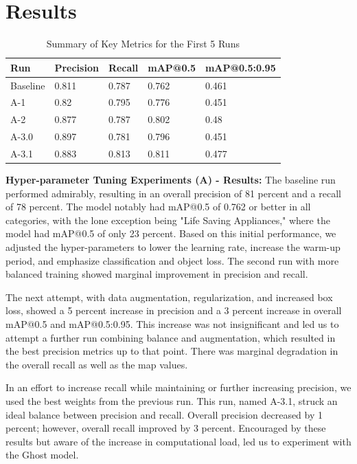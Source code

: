 \documentclass[sigplan,nonacm]{acmart}
\begin{document}
\section*{Results}
\begin{table}[H]
\centering
\begin{tabular}{|l|l|l|l|l|} \hline
\textbf{Run} & \textbf{Precision} & \textbf{Recall} & \textbf{mAP@0.5} & \textbf{mAP@0.5:0.95} \\ \hline
Baseline & 0.811 & 0.787 & 0.762 & 0.461 \\ \hline
A-1 & 0.82 & 0.795 & 0.776 & 0.451 \\ \hline
A-2 & 0.877 & 0.787 & 0.802 & 0.48 \\ \hline
A-3.0 & 0.897 & 0.781 & 0.796 & 0.451 \\ \hline
A-3.1 & 0.883 & 0.813 & 0.811 & 0.477 \\ \hline
\end{tabular}
\caption{Summary of Key Metrics for the First 5 Runs}
\label{tab:resultsA}
\end{table}

\textbf{Hyper-parameter Tuning Experiments (A) - Results:}
The baseline run performed admirably, resulting in an overall precision of 81 percent and a recall of 78 percent. The model notably had mAP@0.5 of 0.762 or better in all categories, with the lone exception being "Life Saving Appliances," where the model had mAP@0.5 of only 23 percent. Based on this initial performance, we adjusted the hyper-parameters to lower the learning rate, increase the warm-up period, and emphasize classification and object loss. The second run with more balanced training showed marginal improvement in precision and recall. 

The next attempt, with data augmentation, regularization, and increased box loss, showed a 5 percent increase in precision and a 3 percent increase in overall mAP@0.5 and mAP@0.5:0.95. This increase was not insignificant and led us to attempt a further run combining balance and augmentation, which resulted in the best precision metrics up to that point. There was marginal degradation in the overall recall as well as the map values. 

In an effort to increase recall while maintaining or further increasing precision, we used the best weights from the previous run. This run, named A-3.1, struck an ideal balance between precision and recall. Overall precision decreased by 1 percent; however, overall recall improved by 3 percent. Encouraged by these results but aware of the increase in computational load, led us to experiment with the Ghost model. 
\end{document}
